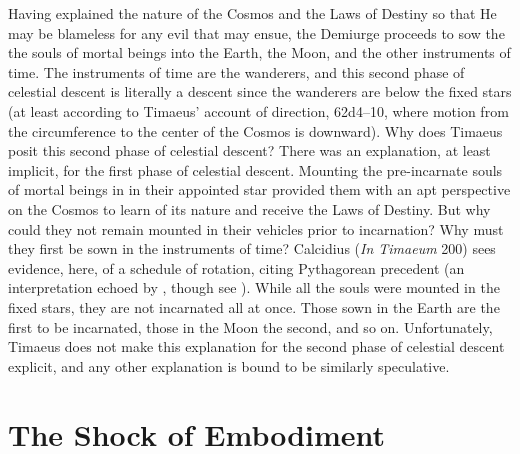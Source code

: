 Having explained the nature of the Cosmos and the Laws of Destiny so that He may be blameless for any evil that may ensue, the Demiurge proceeds to sow the the souls of mortal beings into the Earth, the Moon, and the other instruments of time. The instruments of time are the wanderers, and this second phase of celestial descent is literally a descent since the wanderers are below the fixed stars (at least according to Timaeus' account of direction, 62d4--10, where motion from the circumference to the center of the Cosmos is downward). Why does Timaeus posit this second phase of celestial descent? There was an explanation, at least implicit, for the first phase of celestial descent. Mounting the pre-incarnate souls of mortal beings in in their appointed star provided them with an apt perspective on the Cosmos to learn of its nature and receive the Laws of Destiny. But why could they not remain mounted in their vehicles prior to incarnation? Why must they first be sown in the instruments of time? Calcidius (\emph{In Timaeum} 200) sees evidence, here, of a schedule of rotation, citing Pythagorean precedent (an interpretation echoed by \citealt[146]{Cornford:1935fk}, though see \citealt[258--9]{Taylor:1928qb}). While all the souls were mounted in the fixed stars, they are not incarnated all at once. Those sown in the Earth are the first to be incarnated, those in the Moon the second, and so on. Unfortunately, Timaeus does not make this explanation for the second phase of celestial descent explicit, and any other explanation is bound to be similarly speculative.


\section{The Shock of Embodiment} %
\label{sec:the_shock_of_embodiment}

